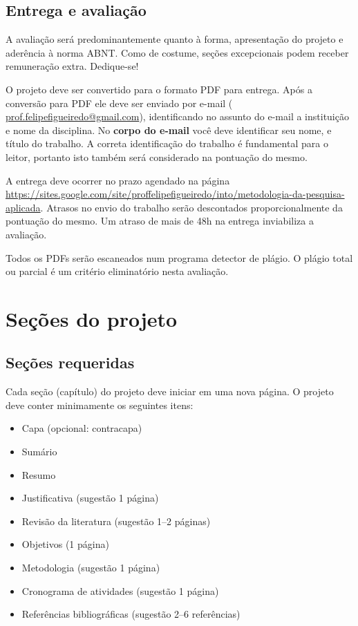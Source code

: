 \documentclass[a4paper]{article}
\begin{document}
\subsection{Entrega e avaliação}

A avaliação será predominantemente quanto à forma, apresentação do projeto e aderência à norma ABNT.
Como de costume, seções excepcionais podem receber remuneração extra.
Dedique-se!

O projeto deve ser convertido para o formato PDF para entrega.
Após a conversão para PDF ele deve ser enviado por e-mail ( \url{prof.felipefigueiredo@gmail.com}), identificando no assunto do e-mail a instituição e nome da disciplina.
No {\bf corpo do e-mail} você deve identificar seu nome, e título do trabalho.
A correta identificação do trabalho é fundamental para o leitor, portanto isto também será considerado na pontuação do mesmo.

A entrega deve ocorrer no prazo agendado na página \url{https://sites.google.com/site/proffelipefigueiredo/into/metodologia-da-pesquisa-aplicada}.
Atrasos no envio do trabalho serão descontados proporcionalmente da pontuação do mesmo.
Um atraso de mais de 48h na entrega inviabiliza a avaliação.

Todos os PDFs serão escaneados num programa detector de plágio.
O plágio total ou parcial é um critério eliminatório nesta avaliação.

\section{Seções do projeto}

\subsection{Seções requeridas}

Cada seção (capítulo) do projeto deve iniciar em uma nova página. O projeto deve
conter minimamente os seguintes itens:

\begin{itemize}
\item Capa (opcional: contracapa)
\item Sumário
\item Resumo
\item Justificativa (sugestão 1 página)
\item Revisão da literatura (sugestão 1--2 páginas)
\item Objetivos (1 página)
\item Metodologia (sugestão 1 página)
\item Cronograma de atividades (sugestão 1 página)
\item Referências bibliográficas (sugestão 2--6 referências)
\end{itemize}
\end{document}
